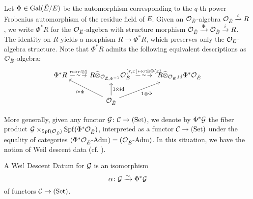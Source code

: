 \documentclass[../main.tex]{subfiles}
\begin{document}
Let $\Phi \in \operatorname{Gal}({\breve {E}} / E)$ be the automorphism corresponding to the
$q$-th power Frobenius automorphism of the residue field of $E$. Given
an $\mathcal{O}_{\breve {E}}$-algebra $\mathcal{O}_{\breve {E}} \xrightarrow{i} R$, we write $\Phi^*R$ for the 
$\mathcal{O}_{\breve {E}}$-algebra with structure morphism $\mathcal{O}_{\breve {E}} \xrightarrow{\Phi} \mathcal{O}_{\breve {E}} \xrightarrow{i} R$.
The identity on $R$ yields a morphism $R \to \Phi^* R$, which preserves only the 
$\mathcal{O}_E$-algebra structure. Note that $\Phi^* R$ admits the following equivalent
descriptions as $\mathcal{O}_{\breve {E}}$-algebra:
\begin{equation}\label{eq:PhiRDescription}
\begin{tikzcd}[ampersand replacement=\&]
	{\Phi^*R} \& {R \cotimes_{\cO_{\br E, \Phi^{-1}}}\cO_{\br E} \ } \& {\ R \cotimes_{\cO_{\br E}, \id} \Phi^*\cO_{\br E}} \\
	\& {\cO_{\br E}}
	\arrow["{r \mapsto r \otimes 1}", draw=none, from=1-1, to=1-2]
	\arrow["\sim"{description}, from=1-1, to=1-2]
	\arrow["{(r,x) \mapsto r \otimes\Phi(x)}", draw=none, from=1-2, to=1-3]
	\arrow["\sim"{description}, from=1-2, to=1-3]
	\arrow["{i \circ \Phi}", from=2-2, to=1-1]
	\arrow["{1 \otimes \id}"', from=2-2, to=1-2]
	\arrow["{1 \otimes \Phi}"', from=2-2, to=1-3]
\end{tikzcd}
\end{equation}

More generally, given any functor $\mathcal{G} \colon \mathcal{C} \to {(\mathrm{Set})}$, we denote by
$\Phi^* \mathcal{G}$ the fiber product $\mathcal{G} \times_{\operatorname{Spf}(\mathcal{O}_{\breve {E}})} \operatorname{Spf}(\Phi^*
\mathcal{O}_{\breve {E}})$, interpreted as a functor $\mathcal{C} \to {(\mathrm{Set})}$ under the
equality of categories ${({\Phi^*\mathcal{O}_{\breve {E}}}\text-\allowbreak\mathrm{Adm})} = {({\mathcal{O}_{\breve {E}}}\text-\allowbreak\mathrm{Adm})}$. In
this situation, we have the notion of Weil descent data
(cf. \cite[Definition 3.45]{rapoport1996period}).

\begin{defi}\label{def:WeilDescentDatum}
  A Weil Descent Datum for $\mathcal{G}$ is an isomorphism
  \begin{equation*}
    \alpha \colon \mathcal{G} \xrightarrow{\sim} \Phi^* \mathcal{G}
  \end{equation*}
  of functors $\mathcal{C} \to {(\mathrm{Set})}$.
\end{defi}
\end{document}
